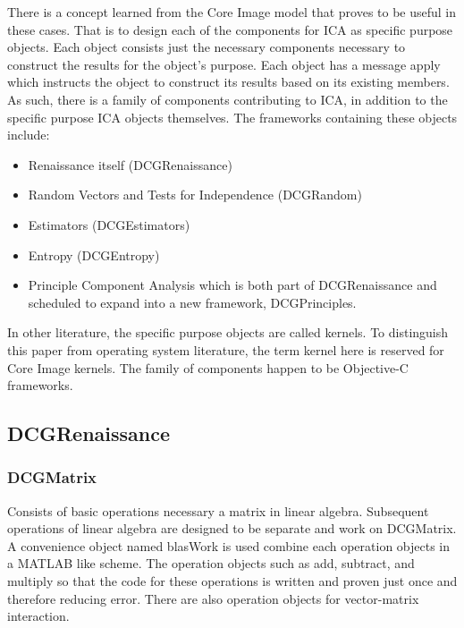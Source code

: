 \documentclass[12pt ]{article}
\begin{document}
There is a concept learned from the Core Image model \cite{apple-core-image} that proves to be useful in these cases.  That is to design each of the components for ICA as specific purpose objects.  Each object consists just the necessary components necessary to construct the results for the object's purpose.  %
Each object has a message apply which instructs the object to construct its results based on its existing members.  
As such, there is a family of components contributing to ICA, in addition to the specific purpose ICA objects themselves.   %
The frameworks containing these objects include:
\begin{itemize}
	\item Renaissance itself (DCGRenaissance)
	\item Random Vectors and Tests for Independence (DCGRandom)
	\item Estimators (DCGEstimators)
	\item Entropy (DCGEntropy) 
	\item Principle Component Analysis which is both part of DCGRenaissance and scheduled to expand into a new framework, DCGPrinciples.
\end{itemize}
In other literature, the specific purpose objects are called kernels.  To distinguish this paper from operating system literature, the term kernel here is reserved for Core Image kernels.  The family of components happen to be Objective-C frameworks.  


\subsection{DCGRenaissance}

\subsubsection {DCGMatrix}
Consists of basic operations necessary a matrix in linear algebra.  Subsequent operations of linear algebra are designed to be separate and work on DCGMatrix.  A convenience  object named blasWork is used combine each operation objects in a MATLAB like scheme.  The operation objects such as add, subtract, and multiply so that the code for these operations is written and proven just once and therefore reducing error.   There are %
also operation objects for vector-matrix interaction.  
\end{document}
